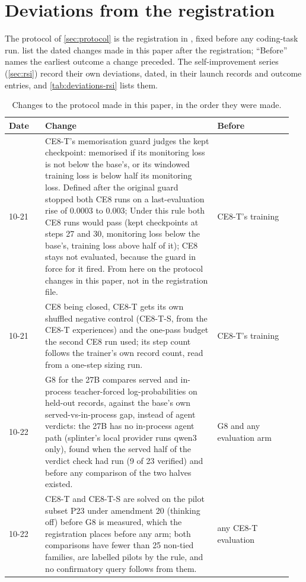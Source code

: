 
\section{Deviations from the registration}\label{app:deviations}

The protocol of \cref{sec:protocol} is the registration in , fixed before
any coding-task run.  list the dated changes made in this paper after the
registration; ``Before'' names the earliest outcome a change preceded. The self-improvement series
(\cref{sec:rsi}) record their own deviations, dated, in their launch records and outcome entries, and
\cref{tab:deviations-rsi} lists them.

\begin{table}[tbp]
\centering\small
\setlength{\tabcolsep}{3pt}
\begin{tabular}{@{}p{0.12\linewidth}p{0.58\linewidth}p{0.25\linewidth}@{}}
\toprule
Date & Change & Before \\
\midrule
10-21 & CE8-T's memorisation guard judges the kept checkpoint: memorised if its monitoring loss is not below the base's, or its windowed training loss is below half its monitoring loss. Defined after the original guard stopped both CE8 runs on a last-evaluation rise of 0.0003 to 0.003; Under this rule both CE8 runs would pass (kept checkpoints at steps 27 and 30, monitoring loss below the base's, training loss above half of it); CE8 stays not evaluated, because the guard in force for it fired. From here on the protocol changes in this paper, not in the registration file. & CE8-T's training \\
10-21 & CE8 being closed, CE8-T gets its own shuffled negative control (CE8-T-S, from the CE8-T experiences) and the one-pass budget the second CE8 run used; its step count follows the trainer's own record count, read from a one-step sizing run. & CE8-T's training \\
10-22 & G8 for the 27B compares served and in-process teacher-forced log-probabilities on held-out records, against the base's own served-vs-in-process gap, instead of agent verdicts: the 27B has no in-process agent path (splinter's local provider runs qwen3 only), found when the served half of the verdict check had run (9 of 23 verified) and before any comparison of the two halves existed. & G8 and any evaluation arm \\
10-22 & CE8-T and CE8-T-S are solved on the pilot subset P23 under amendment 20 (thinking off) before G8 is measured, which the registration places before any arm; both comparisons have fewer than 25 non-tied families, are labelled pilots by the rule, and no confirmatory query follows from them. & any CE8-T evaluation \\
\bottomrule
\end{tabular}
\caption{Changes to the protocol made in this paper, in the order they were made.}\label{tab:deviations}
\end{table}

